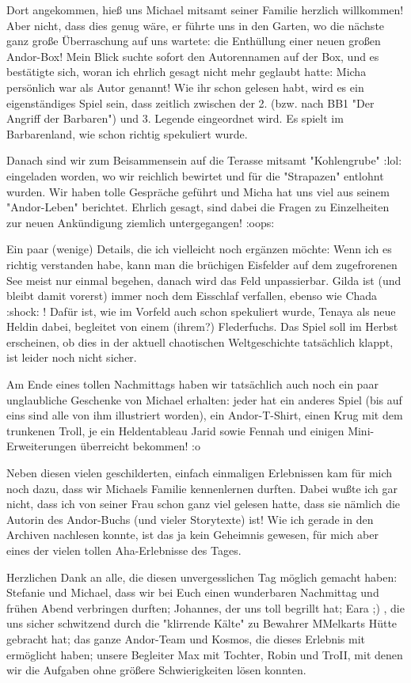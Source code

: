 \documentclass[10pt, a4paper, oneside]{book}
\begin{document}
\begin{multicols}{2}
Dort angekommen, hieß uns Michael mitsamt seiner Familie herzlich willkommen! Aber nicht, dass dies genug wäre, er führte uns in den Garten, wo die nächste ganz große Überraschung auf uns wartete: die Enthüllung einer neuen großen Andor-Box! Mein Blick suchte sofort den Autorennamen auf der Box, und es bestätigte sich, woran ich ehrlich gesagt nicht mehr geglaubt hatte: Micha persönlich war als Autor genannt!
Wie ihr schon gelesen habt, wird es ein eigenständiges Spiel sein, dass zeitlich zwischen der 2. (bzw. nach BB1 "Der Angriff der Barbaren") und 3. Legende eingeordnet wird. Es spielt im Barbarenland, wie schon richtig spekuliert wurde.

Danach sind wir zum Beisammensein auf die Terasse mitsamt "Kohlengrube" :lol: eingeladen worden, wo wir reichlich bewirtet und für die "Strapazen" entlohnt wurden. Wir haben tolle Gespräche geführt und Micha hat uns viel aus seinem "Andor-Leben" berichtet. Ehrlich gesagt, sind dabei die Fragen zu Einzelheiten zur neuen Ankündigung ziemlich untergegangen! :oops:

Ein paar (wenige) Details, die ich vielleicht noch ergänzen möchte:
Wenn ich es richtig verstanden habe, kann man die brüchigen Eisfelder auf dem zugefrorenen See meist nur einmal begehen, danach wird das Feld unpassierbar.
Gilda ist (und bleibt damit vorerst) immer noch dem Eisschlaf verfallen, ebenso wie Chada :shock: ! Dafür ist, wie im Vorfeld auch schon spekuliert wurde, Tenaya als neue Heldin dabei, begleitet von einem (ihrem?) Flederfuchs.
Das Spiel soll im Herbst erscheinen, ob dies in der aktuell chaotischen Weltgeschichte tatsächlich klappt, ist leider noch nicht sicher.

Am Ende eines tollen Nachmittags haben wir tatsächlich auch noch ein paar unglaubliche Geschenke von Michael erhalten: jeder hat ein anderes Spiel (bis auf eins sind alle von ihm illustriert worden), ein Andor-T-Shirt, einen Krug mit dem trunkenen Troll, je ein Heldentableau Jarid sowie Fennah und einigen Mini-Erweiterungen überreicht bekommen! :o

Neben diesen vielen geschilderten, einfach einmaligen Erlebnissen kam für mich noch dazu, dass wir Michaels Familie kennenlernen durften. Dabei wußte ich gar nicht, dass ich von seiner Frau schon ganz viel gelesen hatte, dass sie nämlich die Autorin des Andor-Buchs (und vieler Storytexte) ist! Wie ich gerade in den Archiven nachlesen konnte, ist das ja kein Geheimnis gewesen, für mich aber eines der vielen tollen Aha-Erlebnisse des Tages.

Herzlichen Dank an alle, die diesen unvergesslichen Tag möglich gemacht haben: Stefanie und Michael, dass wir bei Euch einen wunderbaren Nachmittag und frühen Abend verbringen durften; Johannes, der uns toll begrillt hat; Eara ;) , die uns sicher schwitzend durch die "klirrende Kälte" zu Bewahrer MMelkarts Hütte gebracht hat; das ganze Andor-Team und Kosmos, die dieses Erlebnis mit ermöglicht haben; unsere Begleiter Max mit Tochter, Robin und TroII, mit denen wir die Aufgaben ohne größere Schwierigkeiten lösen konnten.


\end{multicols}
\end{document}
